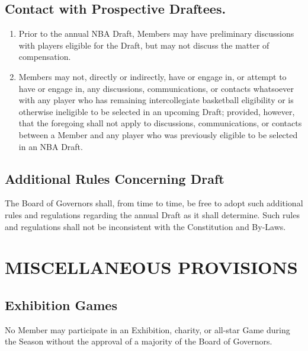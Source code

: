 \documentclass[]{book}
\providecommand{\tightlist}{%
  \setlength{\itemsep}{0pt}\setlength{\parskip}{0pt}}
\begin{document}
\hypertarget{contact-with-prospective-draftees.}{%
\subsection{Contact with Prospective Draftees.}\label{contact-with-prospective-draftees.}}

\begin{enumerate}
\def\labelenumi{(\alph{enumi})}
\tightlist
\item
  Prior to the annual NBA Draft, Members may have preliminary discussions with players eligible for the Draft, but may not discuss the matter of compensation.
\item
  Members may not, directly or indirectly, have or engage in, or attempt to have or engage in, any discussions, communications, or contacts whatsoever with any player who has remaining intercollegiate basketball eligibility or is otherwise ineligible to be selected in an upcoming Draft; provided, however, that the foregoing shall not apply to discussions, communications, or contacts between a Member and any player who was previously eligible to be selected in an NBA Draft.
\end{enumerate}

\hypertarget{additional-rules-concerning-draft}{%
\subsection{Additional Rules Concerning Draft}\label{additional-rules-concerning-draft}}

The Board of Governors shall, from time to time, be free to adopt such additional rules and regulations regarding the annual Draft as it shall determine. Such rules and regulations shall not be inconsistent with the Constitution and By-Laws.

\hypertarget{miscellaneous-provisions}{%
\section{MISCELLANEOUS PROVISIONS}\label{miscellaneous-provisions}}

\hypertarget{exhibition-games}{%
\subsection{Exhibition Games}\label{exhibition-games}}

No Member may participate in an Exhibition, charity, or all-star Game during the Season without the approval of a majority of the Board of Governors.
\end{document}
